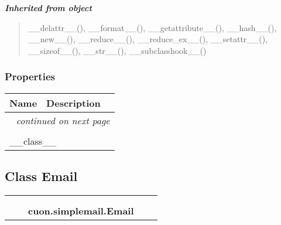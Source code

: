 \large{\textbf{\textit{Inherited from object}}}

\begin{quote}
\_\_delattr\_\_(), \_\_format\_\_(), \_\_getattribute\_\_(), \_\_hash\_\_(), \_\_new\_\_(), \_\_reduce\_\_(), \_\_reduce\_ex\_\_(), \_\_setattr\_\_(), \_\_sizeof\_\_(), \_\_str\_\_(), \_\_subclasshook\_\_()
\end{quote}


  \subsubsection{Properties}

    \vspace{-1cm}
\hspace{\varindent}\begin{longtable}{|p{\varnamewidth}|p{\vardescrwidth}|l}
\cline{1-2}
\cline{1-2} \centering \textbf{Name} & \centering \textbf{Description}& \\
\cline{1-2}
\endhead\cline{1-2}\multicolumn{3}{r}{\small\textit{continued on next page}}\\\endfoot\cline{1-2}
\endlastfoot\multicolumn{2}{|l|}{\textit{Inherited from object}}\\
\multicolumn{2}{|p{\varwidth}|}{\raggedright \_\_class\_\_}\\
\cline{1-2}
\end{longtable}



\subsection{Class Email}

    \label{cuon:simplemail:Email}
\begin{tabular}{cccccc}
\multicolumn{2}{r}{\settowidth{\BCL}{object}\multirow{2}{\BCL}{object}}
&&
  \\\cline{3-3}
  &&\multicolumn{1}{c|}{}
&&
  \\
&&\multicolumn{2}{l}{\textbf{cuon.simplemail.Email}}
\end{tabular}


